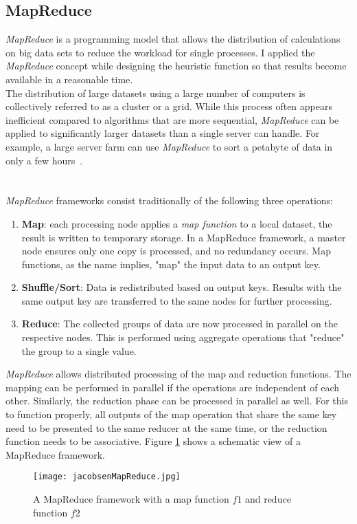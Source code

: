 \subsection{MapReduce}
\textit{MapReduce} is a programming model that allows the distribution of calculations on big data sets to reduce the workload for single processes. I applied the \textit{MapReduce} concept while designing the heuristic function so that results become available in a reasonable time.\\
The distribution of large datasets using a large number of computers is collectively referred to as a cluster or a grid. While this process often appears inefficient compared to algorithms that are more sequential, \textit{MapReduce} can be applied to significantly larger datasets than a single server can handle. For example, a large server farm can use \textit{MapReduce} to sort a petabyte of data in only a few hours~\cite{Czajkowski2011}.\\
\\\\
\textit{MapReduce} frameworks consist traditionally of the following three operations:
\begin{enumerate}
	\item \textbf{Map}: each processing node applies a \textit{map function} to a local dataset, the result is written to temporary storage. In a MapReduce framework, a master node ensures only one copy is processed, and no redundancy occurs. Map functions, as the name implies, "map" the input data to an output key.
	\item \textbf{Shuffle/Sort}: Data is redistributed based on output keys. Results with the same output key are transferred to the same nodes for further processing.
	\item \textbf{Reduce}: The collected groups of data are now processed in parallel on the respective nodes. This is performed using aggregate operations that "reduce" the group to a single value.
\end{enumerate}
\textit{MapReduce} allows distributed processing of the map and reduction functions. The mapping can be performed in parallel if the operations are independent of each other. Similarly, the reduction phase can be processed in parallel as well. For this to function properly, all outputs of the map operation that share the same key need to be presented to the same reducer at the same time, or the reduction function needs to be associative. Figure \ref{fig:mapReduce} shows a schematic view of a MapReduce framework.~\cite{Dean2008}
\begin{figure}
	\centering
	\texttt{[image: jacobsenMapReduce.jpg]}
	\caption{A MapReduce framework with a map function $f1$ and reduce function $f2$~\cite{Dean2008}}
	\label{fig:mapReduce}
\end{figure}
